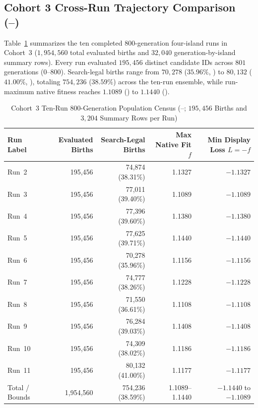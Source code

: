 \subsection{Cohort 3 Cross-Run Trajectory Comparison (--)}
Table~\ref{tab:cohort3-runs} summarizes the ten completed 800-generation four-island runs in Cohort~3 ($1{,}954{,}560$ total evaluated births and $32{,}040$ generation-by-island summary rows). Every run evaluated $195{,}456$ distinct candidate IDs across $801$ generations ($0$--$800$). Search-legal births range from $70{,}278$ ($35.96\%$, ) to $80{,}132$ ($41.00\%$, ), totaling $754{,}236$ ($38.59\%$) across the ten-run ensemble, while run-maximum native fitness reaches $1.1089$ () to $1.1440$ ().

\begin{table}[t]
\centering
\caption{Cohort~3 Ten-Run 800-Generation Population Census (--; $195{,}456$ Births and $3{,}204$ Summary Rows per Run)}
\label{tab:cohort3-runs}
\begin{tabular}{@{}lrrrr@{}}
\toprule
Run Label & Evaluated Births & Search-Legal Births & Max Native Fit $f$ & Min Display Loss $L=-f$ \\
\midrule
Run~2  & 195,456 & 74,874 (38.31\%) & 1.1327 & $-1.1327$ \\
Run~3  & 195,456 & 77,011 (39.40\%) & 1.1089 & $-1.1089$ \\
Run~4  & 195,456 & 77,396 (39.60\%) & 1.1380 & $-1.1380$ \\
Run~5  & 195,456 & 77,625 (39.71\%) & 1.1440 & $-1.1440$ \\
Run~6  & 195,456 & 70,278 (35.96\%) & 1.1156 & $-1.1156$ \\
Run~7  & 195,456 & 74,777 (38.26\%) & 1.1228 & $-1.1228$ \\
Run~8  & 195,456 & 71,550 (36.61\%) & 1.1108 & $-1.1108$ \\
Run~9  & 195,456 & 76,284 (39.03\%) & 1.1408 & $-1.1408$ \\
Run~10 & 195,456 & 74,309 (38.02\%) & 1.1186 & $-1.1186$ \\
Run~11 & 195,456 & 80,132 (41.00\%) & 1.1177 & $-1.1177$ \\
\midrule
Total / Bounds & 1,954,560 & 754,236 (38.59\%) & 1.1089--1.1440 & $-1.1440$ to $-1.1089$ \\
\bottomrule
\end{tabular}
\end{table}

